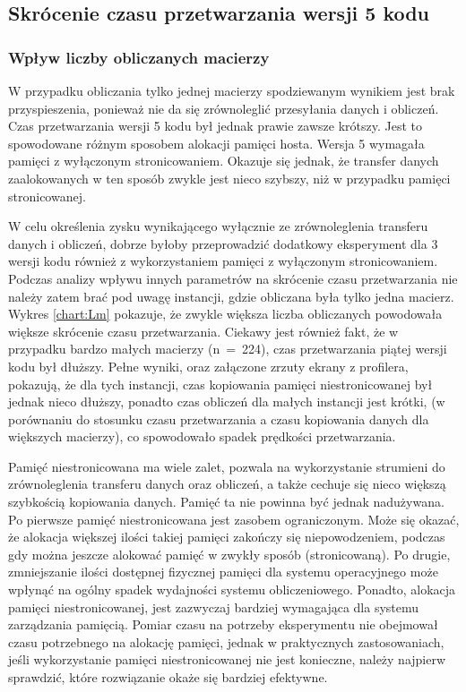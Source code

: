 \documentclass[12pt,a4paper]{article}
\begin{document}
\subsection{Skrócenie czasu przetwarzania wersji 5 kodu}

\subsubsection*{Wpływ liczby obliczanych macierzy}

W przypadku obliczania tylko jednej macierzy spodziewanym wynikiem jest brak przyspieszenia, ponieważ nie da się zrównoleglić przesyłania danych i obliczeń. Czas przetwarzania wersji 5 kodu był jednak prawie zawsze krótszy. Jest to spowodowane różnym sposobem alokacji pamięci hosta. Wersja 5 wymagała pamięci z wyłączonym stronicowaniem. Okazuje się jednak, że transfer danych zaalokowanych w ten sposób zwykle jest nieco szybszy, niż w przypadku pamięci stronicowanej.

W celu określenia zysku wynikającego wyłącznie ze zrównoleglenia transferu danych i obliczeń, dobrze byłoby przeprowadzić dodatkowy eksperyment dla 3 wersji kodu również z wykorzystaniem pamięci z wyłączonym stronicowaniem. Podczas analizy wpływu innych parametrów na skrócenie czasu przetwarzania nie należy zatem brać pod uwagę instancji, gdzie obliczana była tylko jedna macierz. Wykres \ref{chart:Lm} pokazuje, że zwykle większa liczba obliczanych powodowała większe skrócenie czasu przetwarzania. Ciekawy jest również fakt, że w przypadku bardzo małych macierzy (n~=~224), czas przetwarzania piątej wersji kodu był dłuższy. Pełne wyniki, oraz załączone zrzuty ekrany z profilera, pokazują, że dla tych instancji, czas kopiowania pamięci niestronicowanej był jednak nieco dłuższy, ponadto czas obliczeń dla małych instancji jest krótki, (w porównaniu do stosunku czasu przetwarzania a czasu kopiowania danych dla większych macierzy), co spowodowało spadek prędkości przetwarzania.

Pamięć niestronicowana ma wiele zalet, pozwala na wykorzystanie strumieni do zrównoleglenia transferu danych oraz obliczeń, a także cechuje się nieco większą szybkością kopiowania danych. Pamięć ta nie powinna być jednak nadużywana. Po pierwsze pamięć niestronicowana jest zasobem ograniczonym. Może się okazać, że alokacja większej ilości takiej pamięci zakończy się niepowodzeniem, podczas gdy można jeszcze alokować pamięć w zwykły sposób (stronicowaną). Po drugie, zmniejszanie ilości dostępnej fizycznej pamięci dla systemu operacyjnego może wpłynąć na ogólny spadek wydajności systemu obliczeniowego. Ponadto, alokacja pamięci niestronicowanej, jest zazwyczaj bardziej wymagająca dla systemu zarządzania pamięcią. Pomiar czasu na potrzeby eksperymentu nie obejmował czasu potrzebnego na alokację pamięci, jednak w praktycznych zastosowaniach, jeśli wykorzystanie pamięci niestronicowanej nie jest konieczne, należy najpierw sprawdzić, które rozwiązanie okaże się bardziej efektywne.
\end{document}
